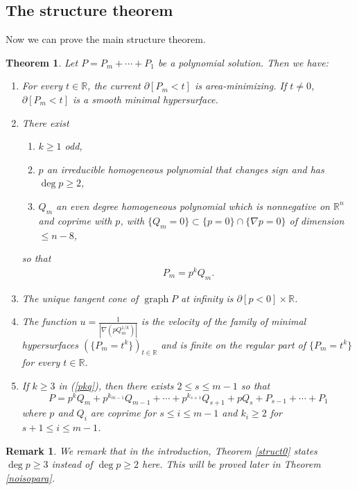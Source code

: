 \documentclass[pdflatex,sn-mathphys-num]{sn-jnl}%
\theoremstyle{thmstyleone}%
\newtheorem{theorem}{Theorem}[section]%
\theoremstyle{thmstyletwo}%
\newtheorem{remark}{Remark}%
\theoremstyle{thmstylethree}%
\newcommand{\R}{\mathbb{R}}
\DeclareMathOperator{\graph}{graph}
\begin{document}
\subsection{The structure theorem}
Now we can prove the main structure theorem.
\begin{theorem}\label{struct}
	Let $P=P_m+\cdots+P_1$ be a polynomial solution. Then we have:
	\begin{enumerate}
		\item[(i)] For every $t\in\R$, the current $\partial [P_m<t]$ is area-minimizing. If $t\neq0$, $\partial[P_m<t]$ is a smooth minimal hypersurface.
		\item[(ii)] There exist 
		\begin{enumerate}
			
			\item [(a)]$k\ge 1$ odd, 
			
			\item[(b)]$p $ an irreducible homogeneous polynomial that changes sign and has $\deg p\ge2$,
			
			\item[(c)] $Q_m$ an even degree homogeneous polynomial which is nonnegative on $\R^n$ and coprime with $p $, with $\{Q_m=0\}\subset\{p=0\}\cap\{\nabla p=0\}$ of dimension $\le n-8$,
			
		\end{enumerate}
		so that
		\begin{align}\label{pkq}
			P_m=p ^kQ_m.
		\end{align}
		
		\item[(iii)] The unique tangent cone of $\graph P$ at infinity is $\partial [p <0]\times \R$.
		
		\item[(iv)]The function $u=\frac{1}{|\nabla (p Q_m^{1/k})|}$ is the velocity of the family of minimal hypersurfaces $(\{P_m=t^k\})_{t\in\R}$ and is finite on the regular part of $\{P_m=t^k\}$ for every $t\in \R$.
		
		
		\item[(v)]  If $k\ge 3$ in (\ref{pkq}), then there exists $2\le s\le m-1$ so that
		\[P=p ^kQ_m+p ^{k_{m-1}} Q_{m-1}+\cdots +p ^{k_{s+1}}Q_{s+1}+p Q_s+P_{s-1}+\cdots+P_1\]
		where  $p $ and $Q_i$ are coprime for $s\le i\le m-1$ and $k_i\ge 2$ for $s+1\le i\le m-1$.
	\end{enumerate}
\end{theorem}
\begin{remark}
	We remark that in the introduction, Theorem \ref{struct0} states $\deg p\ge 3$ instead of $\deg p\ge2$ here. This will be proved later in Theorem \ref{noisopara}.
\end{remark}
\end{document}
